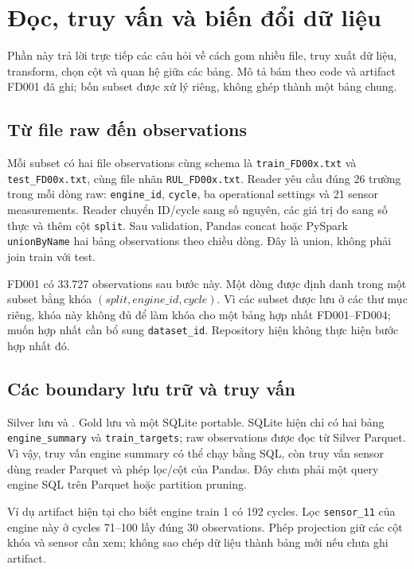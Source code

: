 \section{Đọc, truy vấn và biến đổi dữ liệu}
\label{sec:data-walkthrough}

Phần này trả lời trực tiếp các câu hỏi về cách gom nhiều file, truy xuất dữ liệu,
transform, chọn cột và quan hệ giữa các bảng. Mô tả bám theo code và artifact
FD001 đã ghi; bốn subset được xử lý riêng, không ghép thành một bảng chung.

\subsection{Từ file raw đến observations}

Mỗi subset có hai file observations cùng schema là
\texttt{train\_FD00x.txt} và \texttt{test\_FD00x.txt}, cùng file nhãn
\texttt{RUL\_FD00x.txt}. Reader yêu cầu đúng 26 trường trong mỗi dòng raw:
\texttt{engine\_id}, \texttt{cycle}, ba operational settings và 21 sensor
measurements. Reader chuyển ID/cycle sang số nguyên, các giá trị đo sang số thực
và thêm cột \texttt{split}. Sau validation, Pandas concat hoặc PySpark
\texttt{unionByName} hai bảng observations theo chiều dòng. Đây là union, không
phải join train với test.

FD001 có 33.727 observations sau bước này. Một dòng được định danh trong một
subset bằng khóa $(split, engine\_id, cycle)$. Vì các subset được lưu ở các thư
mục riêng, khóa này không đủ để làm khóa cho một bảng hợp nhất FD001--FD004;
muốn hợp nhất cần bổ sung \texttt{dataset\_id}. Repository hiện không thực hiện
bước hợp nhất đó.

\subsection{Các boundary lưu trữ và truy vấn}

Silver lưu  và .
Gold lưu  và một SQLite portable. SQLite hiện
chỉ có hai bảng \texttt{engine\_summary} và \texttt{train\_targets}; raw
observations được đọc từ Silver Parquet. Vì vậy, truy vấn engine summary có thể
chạy bằng SQL, còn truy vấn sensor dùng reader Parquet và phép lọc/cột của
Pandas. Đây chưa phải một query engine SQL trên Parquet hoặc partition pruning.

Ví dụ artifact hiện tại cho biết engine train 1 có 192 cycles. Lọc
\texttt{sensor\_11} của engine này ở cycles 71--100 lấy đúng 30 observations.
Phép projection giữ các cột khóa và sensor cần xem; không sao chép dữ liệu thành
bảng mới nếu chưa ghi artifact.

